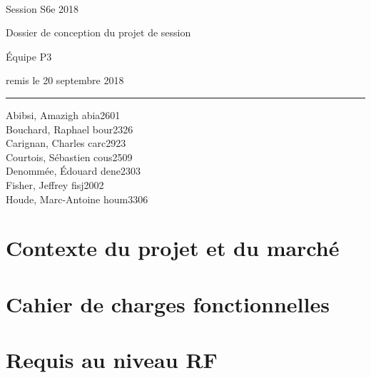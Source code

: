 \documentclass[12pt,titlepage=true,letterpaper,pointlessnumbers,headings=normal,captions=nooneline]{scrartcl}
\begin{document}
\thispagestyle{empty}
\noindent
\begin{center}
{\scshape {}\\[4pt] }

\vspace{3cm}
\textsf{\large Session S6e 2018}

\vspace{.5cm}
\textsf{\Large Dossier de conception du projet de session}

\vspace{.3cm}
\textsf{\large Équipe P3}

\vspace{.25cm}
\textsf{\footnotesize remis le 20 septembre 2018}

\end{center}
\vfill

\noindent
\rule{\linewidth}{.8pt}

\noindent
Abibsi, Amazigh \hfill abia2601\\
Bouchard, Raphael \hfill bour2326\\
Carignan, Charles \hfill carc2923\\
Courtois, Sébastien \hfill cous2509\\
Denommée, Édouard \hfill dene2303\\
Fisher, Jeffrey \hfill fisj2002\\
Houde, Marc-Antoine \hfill houm3306\\


\newpage
\tableofcontents

\newpage
\listoffigures

\newpage
\listoftables


\newpage
\section{Contexte du projet et du marché}

\section{Cahier de charges fonctionnelles}

\section{Requis au niveau RF}
\end{document}
